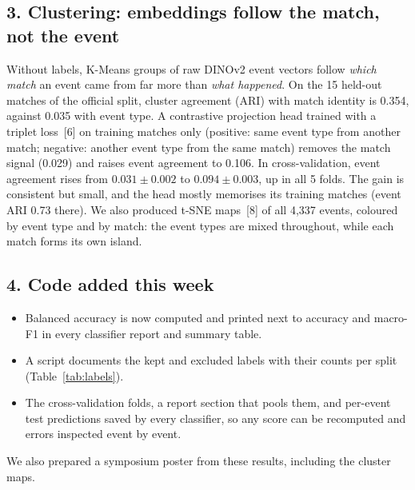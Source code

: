 \documentclass[11pt]{article}
\begin{document}
\subsection*{3. Clustering: embeddings follow the match, not the event}
Without labels, K-Means groups of raw DINOv2 event vectors follow \emph{which match} an event came from
far more than \emph{what happened}. On the 15 held-out matches of the official split, cluster agreement
(ARI) with match identity is 0.354, against 0.035 with event type. A contrastive projection head trained
with a triplet loss~[6] on training matches only (positive: same event type from another match; negative:
another event type from the same match) removes the match signal (0.029) and raises event agreement to
0.106. In cross-validation, event agreement rises from $0.031 \pm 0.002$ to $0.094 \pm 0.003$, up in all 5
folds. The gain is consistent but small, and the head mostly memorises its training matches (event ARI
0.73 there). We also produced t-SNE maps~[8] of all 4,337 events, coloured by event type and by match:
the event types are mixed throughout, while each match forms its own island.

\subsection*{4. Code added this week}
\begin{itemize}[noitemsep]
  \item Balanced accuracy is now computed and printed next to accuracy and macro-F1 in every classifier
        report and summary table.
  \item A script documents the kept and excluded labels with their counts per split
        (Table~\ref{tab:labels}).
  \item The cross-validation folds, a report section that pools them, and per-event test predictions saved
        by every classifier, so any score can be recomputed and errors inspected event by event.
\end{itemize}

We also prepared a symposium poster from these results, including the cluster maps.
\end{document}
